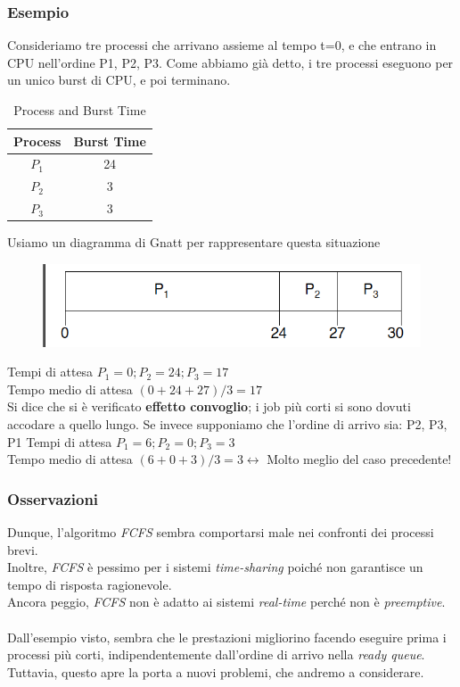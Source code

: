 \subsubsection{Esempio}
Consideriamo tre processi che arrivano assieme al tempo t=0, e che entrano in CPU nell’ordine P1, P2, P3.
Come abbiamo già detto, i tre processi eseguono per un unico burst di CPU, e poi terminano.
\begin{table}[h]
    \centering
    \begin{tabular}{|c|c|}
        \hline
        \textbf{Process} & \textbf{Burst Time} \\
        \hline
        $P_1$ & 24 \\
        $P_2$ & 3 \\
        $P_3$ & 3 \\
        \hline
    \end{tabular}
    \caption{Process and Burst Time}
    \label{tab:process_burst_time}
\end{table}

Usiamo un diagramma di Gnatt per rappresentare questa situazione
\begin{figure}[h]
    \centering
    \includegraphics[width=0.5\linewidth]{images/FCFS_gnatt.png}
\end{figure}
Tempi di attesa $P_1 = 0; P_2 = 24; P_3 = 17$\\
Tempo medio di attesa $(0+24+27)/3 = 17$\\
Si dice che si è verificato \textbf{effetto convoglio}; i job più corti si sono dovuti accodare a quello lungo.
\bigskip
Se invece supponiamo che l'ordine di arrivo sia: P2, P3, P1
Tempi di attesa $P_1 = 6; P_2 = 0; P_3 = 3$\\
Tempo medio di attesa $(6+0+3)/3 = 3 \longleftrightarrow$ Molto meglio del caso precedente!\\

\subsubsection{Osservazioni}
Dunque, l'algoritmo \textit{FCFS} sembra comportarsi male nei confronti dei processi brevi. \\
Inoltre, \textit{FCFS} è pessimo per i sistemi \textit{time-sharing} poiché non garantisce un tempo di risposta ragionevole.\\
Ancora peggio, \textit{FCFS} non è adatto ai sistemi \textit{real-time} perché non è \textit{preemptive}.\\\\
Dall’esempio visto, sembra che le prestazioni migliorino facendo eseguire prima i processi più corti, indipendentemente dall’ordine di arrivo nella \textit{ready queue}. Tuttavia, questo apre la porta a nuovi problemi, che andremo a considerare.

